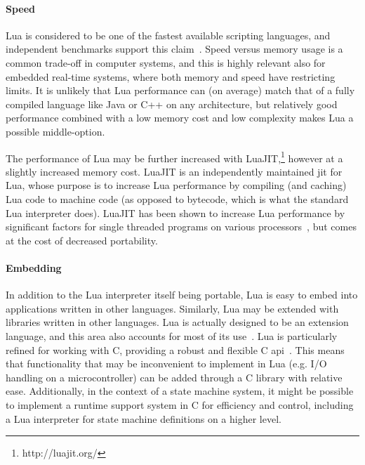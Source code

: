 \paragraph{Speed}
Lua is considered to be one of the fastest available scripting languages, and independent benchmarks support this claim~\cite{website:computer_language_benchmarks_game}. Speed versus memory usage is a common trade-off in computer systems, and this is highly relevant also for embedded real-time systems, where both memory and speed have restricting limits. It is unlikely that Lua performance can (on average) match that of a fully compiled language like Java or C++ on any architecture, but relatively good performance combined with a low memory cost and low complexity makes Lua a possible middle-option.

\noindent
The performance of Lua may be further increased with LuaJIT,\footnote{http://luajit.org/} however at a slightly increased memory cost. LuaJIT is an independently maintained \gls{jit} for Lua, whose purpose is to increase Lua performance by compiling (and caching) Lua code to machine code (as opposed to bytecode, which is what the standard Lua interpreter does). LuaJIT has been shown to increase Lua performance by significant factors for single threaded programs on various processors~\cite{website:luajit_performance}, but comes at the cost of decreased portability.

\paragraph{Embedding}
In addition to the Lua interpreter itself being portable, Lua is easy to embed into applications written in other languages. Similarly, Lua may be extended with libraries written in other languages. Lua is actually designed to be an extension language, and this area also accounts for most of its use~\cite{website:where_lua_is_used}. Lua is particularly refined for working with C, providing a robust and flexible C \gls{api}~\cite[Ch.24]{book:programming_in_lua_first}. This means that functionality that may be inconvenient to implement in Lua (e.g. I/O handling on a microcontroller) can be added through a C library with relative ease. Additionally, in the context of a state machine system, it might be possible to implement a runtime support system in C for efficiency and control, including a Lua interpreter for state machine definitions on a higher level.

